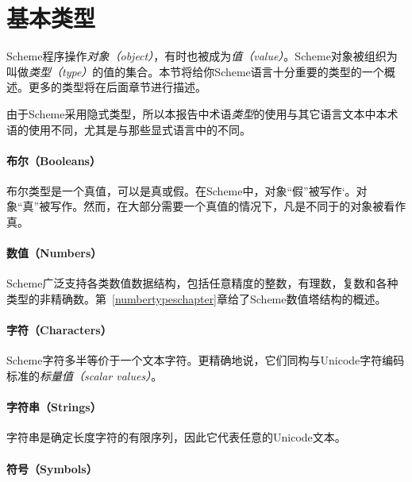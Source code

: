 \section{基本类型}

Scheme程序操作\textit{对象（object）}，有时也被成为\textit{值（value）}。Scheme对象被组织为叫做\textit{类型（type）}的值的集合。本节将给你Scheme语言十分重要的类型的一个概述。更多的类型将在后面章节进行描述。

\begin{note}
  由于Scheme采用隐式类型，所以本报告中术语\textit{类型}的使用与其它语言文本中本术语的使用不同，尤其是与那些显式语言中的不同。
\end{note}

\paragraph{布尔（Booleans）}

布尔类型是一个真值，可以是真或假。在Scheme中，对象“假”被写作`\schfalse{}。对象“真”被写作\schtrue{}。然而，在大部分需要一个真值的情况下，凡是不同于\schfalse{}的对象被看作真。

\paragraph{数值（Numbers）}

Scheme广泛支持各类数值数据结构，包括任意精度的整数，有理数，复数和各种类型的非精确数。第~\ref{numbertypeschapter}章给了Scheme数值塔结构的概述。

\paragraph{字符（Characters）}

Scheme字符多半等价于一个文本字符。更精确地说，它们同构与Unicode字符编码标准的\textit{标量值（scalar values）}。

\paragraph{字符串（Strings）}

字符串是确定长度字符的有限序列，因此它代表任意的Unicode文本。

\paragraph{符号（Symbols）}

